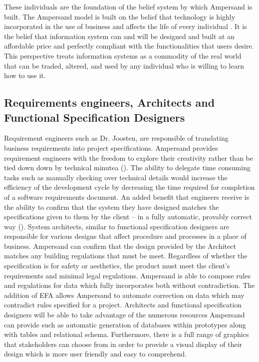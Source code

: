 \documentclass[12pt]{report}
\begin{document}
These individuals are the foundation of
the belief system by which Ampersand is built. The Ampersand model is built on
the belief that technology is highly incorporated in the use of business and
affects the life of every individual .  It is the belief that information system
can and will be designed and built at an affordable price and perfectly
compliant with the functionalities that users desire. This perspective treats
information systems as a commodity of the real world that can be traded,
altered, and used by any individual who is willing to learn how to use it.
\subsection{Requirements engineers, Architects and Functional Specification 
Designers}\label{subsec:BusReq}

Requirement engineers such as Dr. Joosten, are responsible of translating 
business 
requirements into project specifications. Ampersand provides requirement 
engineers with the freedom to explore their creativity rather than be tied down
down by technical minutea (\cite{RBD}). The ability to delegate time consuming 
tasks such as 
manually checking over technical details would increase the efficiency 
of the development cycle by decreasing the time required for 
completion of a software requirements document.
An added benefit that engineers receive is the ability to confirm 
that the system they have designed matches the specifications
 given to them by the client -- in a fully automatic, provably correct way (\cite{applyAlg}). 
System architects, similar to functional specification designers are 
responsible for various designs that affect procedure and processes in a place 
of business. Ampersand can confirm that the design provided by 
the Architect matches any building regulations that must be meet. Regardless of 
whether the specification is for safety or aesthetics, the product must meet the 
client's requirements and minimal legal regulations. Ampersand is able to 
compose rules and regulations for data which fully incorporates both without 
contradiction. The addition of EFA allows Ampersand to automate correction  
on data which may contradict rules specified for a project. Architects and 
functional specification designers will be able to take advantage of the 
numerous resources Ampersand can provide such as automatic generation of 
databases within prototypes along with tables and relational schema. 
Furthermore, there is a full range of graphics that stakeholders can choose 
from in order to provide a visual display of their design which is more user friendly 
and easy to comprehend.
\end{document}
